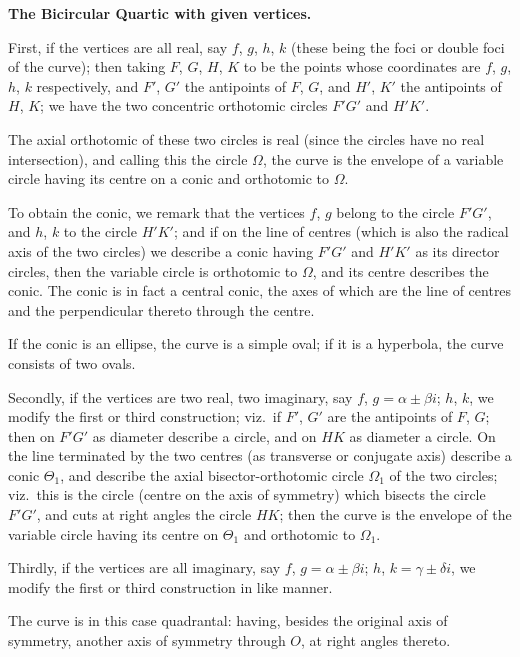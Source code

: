 \documentclass[11pt,a4paper]{book}
\begin{document}
\newpage
\setcounter{page}{14}

\textbf{The Bicircular Quartic with given vertices.}

First, if the vertices are all real, say $f$, $g$, $h$, $k$ (these being the foci or double foci of the curve); then taking $F$, $G$, $H$, $K$ to be the points whose coordinates are $f$, $g$, $h$, $k$ respectively, and $F'$, $G'$ the antipoints of $F$, $G$, and $H'$, $K'$ the antipoints of $H$, $K$; we have the two concentric orthotomic circles $F'G'$ and $H'K'$.

The axial orthotomic of these two circles is real (since the circles have no real intersection), and calling this the circle $\Omega$, the curve is the envelope of a variable circle having its centre on a conic and orthotomic to $\Omega$.

To obtain the conic, we remark that the vertices $f$, $g$ belong to the circle $F'G'$, and $h$, $k$ to the circle $H'K'$; and if on the line of centres (which is also the radical axis of the two circles) we describe a conic having $F'G'$ and $H'K'$ as its director circles, then the variable circle is orthotomic to $\Omega$, and its centre describes the conic. The conic is in fact a central conic, the axes of which are the line of centres and the perpendicular thereto through the centre.

If the conic is an ellipse, the curve is a simple oval; if it is a hyperbola, the curve consists of two ovals.

\newpage
\setcounter{page}{15}

Secondly, if the vertices are two real, two imaginary, say $f$, $g = \alpha \pm \beta i$; $h$, $k$, we modify the first or third construction; viz.\ if $F'$, $G'$ are the antipoints of $F$, $G$; then on $F'G'$ as diameter describe a circle, and on $HK$ as diameter a circle. On the line terminated by the two centres (as transverse or conjugate axis) describe a conic $\Theta_1$, and describe the axial bisector-orthotomic circle $\Omega_1$ of the two circles; viz.\ this is the circle (centre on the axis of symmetry) which bisects the circle $F'G'$, and cuts at right angles the circle $HK$; then the curve is the envelope of the variable circle having its centre on $\Theta_1$ and orthotomic to $\Omega_1$.

Thirdly, if the vertices are all imaginary, say $f$, $g = \alpha \pm \beta i$; $h$, $k = \gamma \pm \delta i$, we modify the first or third construction in like manner.

The curve is in this case quadrantal: having, besides the original axis of symmetry, another axis of symmetry through $O$, at right angles thereto.
\end{document}

